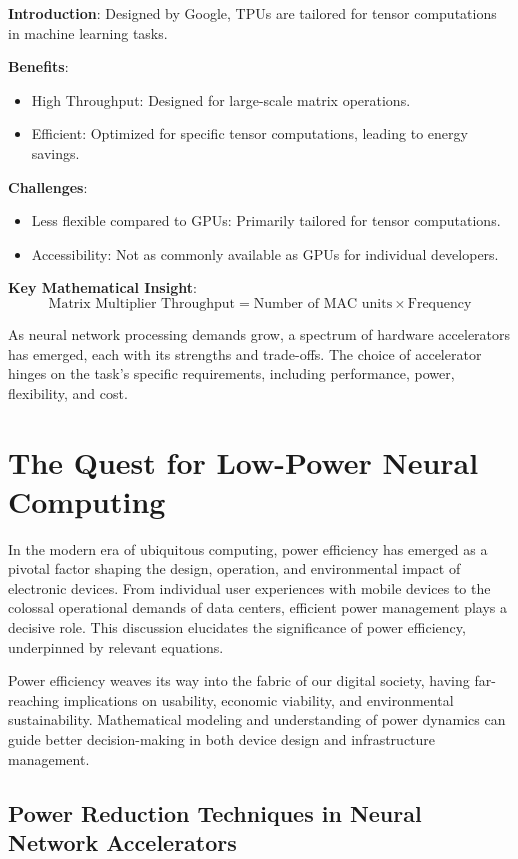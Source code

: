 \textbf{Introduction}: Designed by Google, TPUs are tailored for tensor computations in machine learning tasks.

\textbf{Benefits}:
\begin{itemize}
	\item High Throughput: Designed for large-scale matrix operations.
	\item Efficient: Optimized for specific tensor computations, leading to energy savings.
\end{itemize}

\textbf{Challenges}:
\begin{itemize}
	\item Less flexible compared to GPUs: Primarily tailored for tensor computations.
	\item Accessibility: Not as commonly available as GPUs for individual developers.
\end{itemize}

\textbf{Key Mathematical Insight}:
\[ \text{Matrix Multiplier Throughput} = \text{Number of MAC units} \times \text{Frequency} \]

As neural network processing demands grow, a spectrum of hardware accelerators has emerged, each with its strengths and trade-offs. The choice of accelerator hinges on the task's specific requirements, including performance, power, flexibility, and cost.


\section{The Quest for Low-Power Neural Computing}

In the modern era of ubiquitous computing, power efficiency has emerged as a pivotal factor shaping the design, operation, and environmental impact of electronic devices. From individual user experiences with mobile devices to the colossal operational demands of data centers, efficient power management plays a decisive role. This discussion elucidates the significance of power efficiency, underpinned by relevant equations.


Power efficiency weaves its way into the fabric of our digital society, having far-reaching implications on usability, economic viability, and environmental sustainability. Mathematical modeling and understanding of power dynamics can guide better decision-making in both device design and infrastructure management.

\subsection{Power Reduction Techniques in Neural Network Accelerators}

